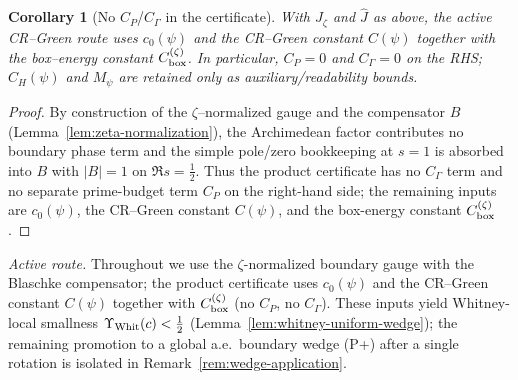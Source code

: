 \documentclass[11pt]{article}
\newtheorem{corollary}[theorem]{Corollary}
\theoremstyle{definition}
\theoremstyle{remark}
\theoremstyle{definition}
\begin{document}

\begin{corollary}[No $C_P$/$C_\Gamma$ in the certificate]
With $J_\zeta$ and $\widehat J$ as above, the active CR–Green route uses $c_0(\psi)$ and the CR–Green constant $C(\psi)$ together with the box–energy constant $C_{\rm box}^{(\zeta)}$. In particular, $C_P=0$ and $C_\Gamma=0$ on the RHS; $C_H(\psi)$ and $M_\psi$ are retained only as auxiliary/readability bounds.
\end{corollary}
\begin{proof}
By construction of the $\zeta$--normalized gauge and the compensator $B$ (Lemma~\ref{lem:zeta-normalization}), the Archimedean factor contributes no boundary phase term and the simple pole/zero bookkeeping at $s=1$ is absorbed into $B$ with $|B|=1$ on $\Re s=\tfrac12$. Thus the product certificate has no $C_\Gamma$ term and no separate prime-budget term $C_P$ on the right-hand side; the remaining inputs are $c_0(\psi)$, the CR--Green constant $C(\psi)$, and the box-energy constant $C_{\rm box}^{(\zeta)}$.
\end{proof}

\noindent\emph{Active route.} Throughout we use the $\zeta$-normalized boundary gauge with the Blaschke compensator; the product certificate uses $c_0(\psi)$ and the CR–Green constant $C(\psi)$ together with $C_{\rm box}^{(\zeta)}$ (no $C_P$, no $C_\Gamma$). These inputs yield Whitney-local smallness $\Upsilon_{\rm Whit}(c)<\tfrac12$ (Lemma~\ref{lem:whitney-uniform-wedge}); the remaining promotion to a global a.e.\ boundary wedge \textup{(P+)} after a single rotation is isolated in Remark~\ref{rem:wedge-application}.

\end{document}
